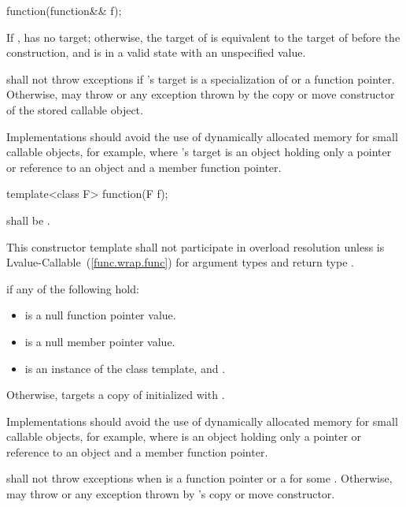 %
\begin{itemdecl}
function(function&& f);
\end{itemdecl}

\begin{itemdescr}
\pnum
\postconditions If ,  has no target;
otherwise, the target of  is equivalent to
the target of  before the construction, and
 is in a valid state with an unspecified value.

\pnum
\throws shall not throw exceptions if 's target is
a specialization of  or
a function pointer. Otherwise, may throw  or
any exception thrown by the copy or move constructor
of the stored callable object.
\begin{note} Implementations should avoid the use of
dynamically allocated memory for small callable objects, for example,
where 's target is an object holding only a pointer or reference
to an object and a member function pointer. \end{note}
\end{itemdescr}

%
\begin{itemdecl}
template<class F> function(F f);
\end{itemdecl}

\begin{itemdescr}
\pnum
\requires {} shall be .

\pnum
\remarks This constructor template shall not participate in overload resolution unless
 is Lvalue-Callable~(\ref{func.wrap.func}) for argument types
 and return type .

\pnum
\postconditions {} if any of the following hold:
\begin{itemize}
\item {} is a null function pointer value.
\item {} is a null member pointer value.
\item {} is an instance of the  class template, and
  .
\end{itemize}

\pnum
Otherwise,  targets a copy of 
initialized with .
\begin{note} Implementations should avoid the use of
dynamically allocated memory for small callable objects, for example,
where  is an object holding only a pointer or
reference to an object and a member function pointer. \end{note}

\pnum
\throws shall not throw exceptions when  is a function pointer
or a  for some . Otherwise,
may throw  or any exception thrown by 's copy
or move constructor.
\end{itemdescr}


